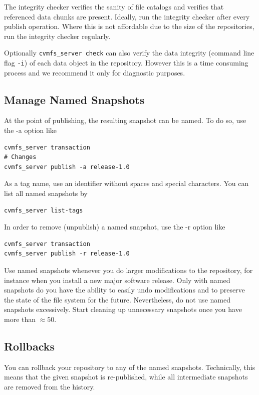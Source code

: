 The integrity checker verifies the sanity of file catalogs and verifies that referenced data chunks are present.
Ideally, run the integrity checker after every publish operation.
Where this is not affordable due to the size of the repositories, run the integrity checker regularly.

Optionally \texttt{cvmfs\_server check} can also verify the data integrity (command line flag \texttt{-i}) of each data object in the repository.
However this is a time consuming process and we recommend it only for diagnostic purposes.

\subsection{Manage Named Snapshots}
\label{sct:namedsnapshots}

At the point of publishing, the resulting snapshot can be named.
To do so, use the -a option like
\begin{verbatim}
cvmfs_server transaction
# Changes
cvmfs_server publish -a release-1.0
\end{verbatim}

As a tag name, use an identifier without spaces and special characters.
You can list all named snapshots by
\begin{verbatim}
cvmfs_server list-tags
\end{verbatim}

In order to remove (unpublish) a named snapshot, use the -r option like
\begin{verbatim}
cvmfs_server transaction
cvmfs_server publish -r release-1.0
\end{verbatim}

Use named snapshots whenever you do larger modifications to the repository, for instance when you install a new major software release.
Only with named snapshots do you have the ability to easily undo modifications and to preserve the state of the file system for the future.
Nevertheless, do not use named snapshots excessively.
Start cleaning up unnecessary snapshots once you have more than $\approx 50$.

\subsection{Rollbacks}

You can rollback your repository to any of the named snapshots.
Technically, this means that the given snapshot is re-published, while all intermediate snapshots are removed from the history.


